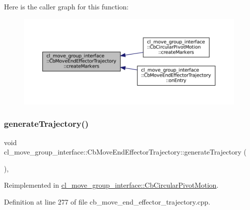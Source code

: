 Here is the caller graph for this function\+:
\nopagebreak
\begin{figure}[H]
\begin{center}
\leavevmode
\includegraphics[width=350pt]{classcl__move__group__interface_1_1CbMoveEndEffectorTrajectory_a442efa1d5bc9e9a16f74ecd31b13d9b5_icgraph}
\end{center}
\end{figure}
\mbox{\label{classcl__move__group__interface_1_1CbMoveEndEffectorTrajectory_aeae938ab66e18ab7d2fb2427bc83647b}} 
\subsubsection{\texorpdfstring{generate\+Trajectory()}{generateTrajectory()}}
{\footnotesize\ttfamily void cl\+\_\+move\+\_\+group\+\_\+interface\+::\+Cb\+Move\+End\+Effector\+Trajectory\+::generate\+Trajectory (\begin{DoxyParamCaption}{ }\end{DoxyParamCaption})\hspace{0.3cm}{\ttfamily [protected]}, {\ttfamily [virtual]}}



Reimplemented in \hyperlink{classcl__move__group__interface_1_1CbCircularPivotMotion_a8d019ec6b9b26a2af0740b915d441a40}{cl\+\_\+move\+\_\+group\+\_\+interface\+::\+Cb\+Circular\+Pivot\+Motion}.



Definition at line 277 of file cb\+\_\+move\+\_\+end\+\_\+effector\+\_\+trajectory.\+cpp.




